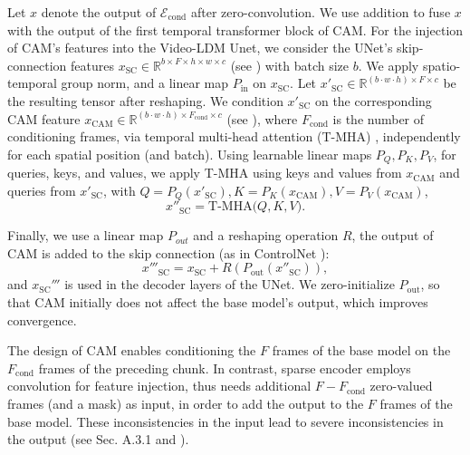 Let $x$ denote the output of $\mathcal{E}_{\text{cond}}$ after zero-convolution. 
We use addition to fuse $x$ with the output of the first temporal transformer block of CAM. 
For the injection of CAM's features into the Video-LDM Unet, we consider the UNet's skip-connection features $x_{\mathrm{SC}} \in \mathbb{R}^{b \times F \times h \times w \times c}$ (see ) with batch size $b$.  We apply spatio-temporal group norm, and a linear map $P_{\mathrm{in}}$ on $x_{\mathrm{SC}}$. 
Let $x'_{\mathrm{SC}} \in \mathbb{R}^{(b\cdot w \cdot h) \times F \times c}$ be the resulting tensor after reshaping. 
We condition $x'_{\mathrm{SC}}$ on the corresponding CAM feature $x_{\mathrm{CAM}} \in \mathbb{R}^{(b\cdot w \cdot h) \times F_{\mathrm{cond}} \times c}$ (see ), where $F_{\mathrm{cond}}$ is the number of conditioning frames, via temporal multi-head attention (T-MHA) \cite{vaswani2017attention}, \ie independently for each spatial position (and batch).
Using learnable linear maps $P_Q,P_K,P_V$, for queries, keys, and values, we apply T-MHA using keys and values from $x_{\mathrm{CAM}}$ and queries from $x'_{\mathrm{SC}}$, \ie with $Q = P_Q(x'_{\text{SC}}), K = P_K(x_{\mathrm{CAM}}), V =P_V(x_{\mathrm{CAM}})$,
\begin{equation}
       \displaystyle x''_{\mathrm{SC}} = \text{T-MHA}\bigl(Q, K, V )\bigr.
\end{equation}

Finally, we use a linear map $P_{out}$ and a reshaping operation $R$, the  output of CAM is added to the skip connection (as in ControlNet \cite{controlnet}): 
\begin{equation}
    x'''_{\mathrm{SC}} = x_{\mathrm{SC}} + R(P_{\text{out}}(x''_{\text{SC}})),
\end{equation}
and $x_{\mathrm{SC}}'''$ is used in the decoder layers of the UNet. 
We zero-initialize $P_{\text{out}}$, so that CAM initially does not affect the base model's output, which improves convergence. 

The design of CAM enables conditioning the $F$ frames of the base model on the $F_{\mathrm{cond}}$ frames of the preceding chunk.
In contrast, sparse encoder \cite{guo2023sparsectrl} employs convolution for feature injection, thus needs additional $F-F_{\mathrm{cond}}$ zero-valued frames (and a mask) as input, in order to add the output to the $F$ frames of the base model. These  inconsistencies in the input lead to severe inconsistencies in the output (see 
Sec. \textcolor{linkblue}{A.3.1}
and ).
